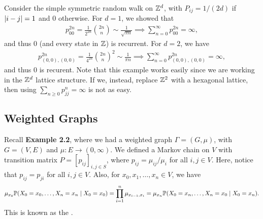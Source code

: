 \begin{example}
    Consider the simple symmetric random walk on $\mathbb{Z}^{d}$, with $P_{ij} = 1/(2d)$ if $\left| i-j \right|=1$ and $0$ otherwise. For $d = 1$, we showed that
    \begin{align}
        p_{00}^{2n} = \frac{1}{2^{2n}}\binom{2n}{n} \sim \frac{1}{\sqrt{\pi n}} \implies \sum_{n=0}^{\infty} p_{00}^{2n} = \infty,
    \end{align}
    and thus $0$ (and every state in $\mathbb{Z}$) is recurrent. For $d = 2$, we have
    \begin{align}
        p_{(0,0),(0,0)}^{2n} = \frac{1}{4^{2n}}\binom{2n}{n}^{2} \sim \frac{1}{\pi n} \implies \sum_{n=0}^{\infty} p_{(0,0),(0,0)}^{2n} = \infty,
    \end{align}
    and thus $0$ is recurent. Note that this example works easily since we are working in the $\mathbb{Z}^{d}$ lattice structure. If we, instead, replace $\mathbb{Z}^{2}$ with a hexagonal lattice, then using $\sum_{n \geq 0} p_{jj}^{n} = \infty$ is not as easy. 
\end{example}


\subsection{Weighted Graphs}
Recall \textbf{Example 2.2}, where we had a weighted graph $\Gamma = (G,\mu)$, with $G = (V,E)$ and $\mu:E \to (0,\infty)$. We defined a Markov chain on $V$ with transition matrix $P = [p_{ij}]_{i,j \in S}$, where $p_{ij} = \mu_{ij}/\mu_{i}$ for all $i,j \in V$. Here, notice that $p_{ij} = p_{ji}$ for all $i,j \in V$. Also, for $x_{0},x_{1},\ldots,x_{n} \in V$, we have
\begin{align}
    \mu_{x_{0}} \mathbb{P}(X_{0}=x_{0},\ldots,X_{n}=x_{n} \mid X_{0}=x_{0}) = \prod_{i=1}^{n} \mu_{x_{i-1},x_{i}} = \mu_{x_{n}} \mathbb{P}(X_{0}=x_{n},\ldots,X_{n}=x_{0} \mid X_{0}=x_{n}).
\end{align}
This is known as the .

